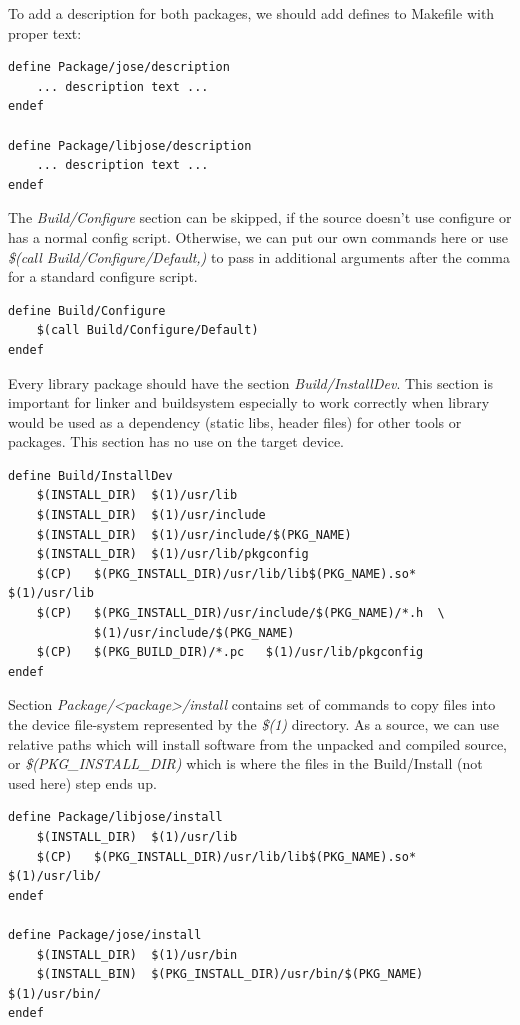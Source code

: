 To add a description for both packages, we should add defines to Makefile with proper text:
\begin{lstlisting}[columns=fixed,basicstyle=\ttfamily\footnotesize,tabsize=4,backgroundcolor=\color{yellow!10}]
define Package/jose/description
	... description text ...
endef

define Package/libjose/description
	... description text ...
endef
\end{lstlisting}
The {\it Build/Configure} section can be skipped, if the source doesn't use configure or has a normal config script. Otherwise, we can put our own commands here or use {\it \$(call Build/Configure/Default,)} to pass in additional arguments after the comma for a standard configure script.
\begin{lstlisting}[columns=fixed,basicstyle=\ttfamily\footnotesize,tabsize=4,backgroundcolor=\color{yellow!10}]
define Build/Configure
	$(call Build/Configure/Default)
endef
\end{lstlisting}
Every library package should have the section {\it Build/InstallDev}.
This section is important for linker and buildsystem especially to work correctly when library would be used as a dependency (static libs, header files) for other tools or packages.
This section has no use on the target device.
\begin{lstlisting}[columns=fixed,basicstyle=\ttfamily\footnotesize,tabsize=4,backgroundcolor=\color{yellow!10}]
define Build/InstallDev
	$(INSTALL_DIR)	$(1)/usr/lib
	$(INSTALL_DIR)  $(1)/usr/include
	$(INSTALL_DIR)	$(1)/usr/include/$(PKG_NAME)
	$(INSTALL_DIR)	$(1)/usr/lib/pkgconfig
	$(CP)	$(PKG_INSTALL_DIR)/usr/lib/lib$(PKG_NAME).so*	$(1)/usr/lib
	$(CP)	$(PKG_INSTALL_DIR)/usr/include/$(PKG_NAME)/*.h	\
			$(1)/usr/include/$(PKG_NAME)
	$(CP)	$(PKG_BUILD_DIR)/*.pc	$(1)/usr/lib/pkgconfig
endef
\end{lstlisting}
Section {\it Package/<package>/install} contains set of commands to copy files into the device file-system represented by the {\it \$(1)} directory.
As a source, we can use relative paths which will install software from the unpacked and compiled source, or {\it \$(PKG\_INSTALL\_DIR)} which is where the files in the Build/Install (not used here) step ends up.
\begin{lstlisting}[columns=fixed,basicstyle=\ttfamily\footnotesize,tabsize=4,backgroundcolor=\color{yellow!10}]
define Package/libjose/install
	$(INSTALL_DIR)	$(1)/usr/lib
	$(CP)	$(PKG_INSTALL_DIR)/usr/lib/lib$(PKG_NAME).so*	$(1)/usr/lib/
endef

define Package/jose/install
	$(INSTALL_DIR)	$(1)/usr/bin
	$(INSTALL_BIN)	$(PKG_INSTALL_DIR)/usr/bin/$(PKG_NAME)	$(1)/usr/bin/
endef
\end{lstlisting}
